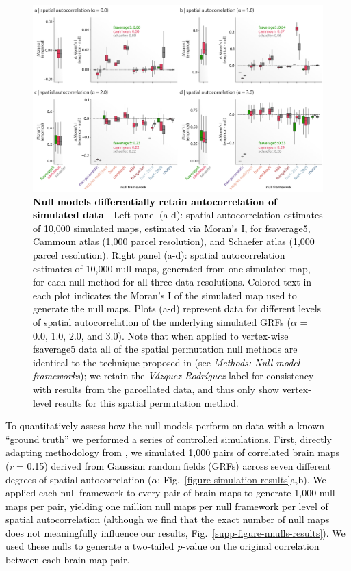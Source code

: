 \documentclass[12pt,aps,pra,reprint,showkeys]{revtex4-1}
\newcommand{\nimg}[1]{\textcolor{black}{{#1}}}
\begin{document}
\begin{figure}[htp]
  \begin{center}
    \centerline{\includegraphics[width=\textwidth]{moran_results.png}}
    \caption{
      \nimg{\textbf{Null models differentially retain autocorrelation of simulated data |}
      Left panel (a-d): spatial autocorrelation estimates of 10,000 simulated maps, estimated via Moran’s I, for fsaverage5, Cammoun atlas (1,000 parcel resolution), and Schaefer atlas (1,000 parcel resolution).
      Right panel (a-d): spatial autocorrelation estimates of 10,000 null maps, generated from one simulated map, for each null method for all three data resolutions.
      Colored text in each plot indicates the Moran’s I of the simulated map used to generate the null maps.
      Plots (a-d) represent data for different levels of spatial autocorrelation of the underlying simulated GRFs ($\alpha$ = 0.0, 1.0, 2.0, and 3.0).
      Note that when applied to vertex-wise fsaverage5 data all of the spatial permutation null methods are identical to the technique proposed in \citet{alexanderbloch2018neuroimage} (see \textit{Methods: Null model frameworks}); we retain the \textit{V{\'a}zquez-Rodr{\'i}guez} label for consistency with results from the parcellated data, and thus only show vertex-level results for this spatial permutation method.}
      }
    \label{figure-moran-results}
  \end{center}
\end{figure}

\nimg{To quantitatively assess how the null models perform on data with a known ``ground truth'' we performed a series of controlled simulations.
First, directly adapting methodology from \citet{burt2020neuroimage}, we simulated 1,000 pairs of correlated brain maps (\emph{r} = 0.15) derived from Gaussian random fields (GRFs) across seven different degrees of spatial autocorrelation ($\alpha$; Fig.~\ref{figure-simulation-results}a,b).
We applied each null framework to every pair of brain maps to generate 1,000 null maps per pair, yielding one million null maps per null framework per level of spatial autocorrelation (although we find that the exact number of null maps does not meaningfully influence our results, Fig.~\ref{supp-figure-nnulls-results}).
We used these nulls to generate a two-tailed \emph{p}-value on the original correlation between each brain map pair.}
\end{document}
